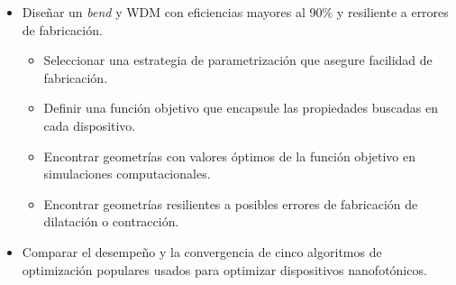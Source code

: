 \begin{itemize}

  \item Diseñar un \emph{bend} y WDM con eficiencias mayores al 90\% y resiliente a errores de fabricación.

  \begin{itemize}

    \item Seleccionar una estrategia de parametrización que asegure facilidad de fabricación.

    \item Definir una función objetivo que encapsule las propiedades buscadas en cada dispositivo.

    \item Encontrar geometrías con valores óptimos de la función objetivo en simulaciones computacionales.

    \item Encontrar geometrías resilientes a posibles errores de fabricación de dilatación o contracción.

  \end{itemize}

  \item Comparar el desempeño y la convergencia de cinco algoritmos de optimización populares usados para optimizar dispositivos nanofotónicos.

\end{itemize}
